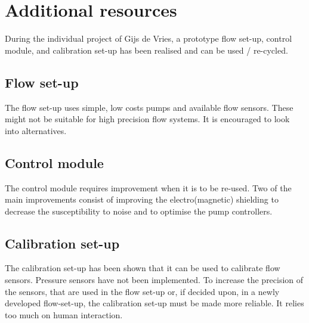 \section{Additional resources}
During the individual project of Gijs de Vries, a prototype flow set-up, control module, and calibration set-up has been realised and can be used / re-cycled.
\subsection{Flow set-up}
The flow set-up uses simple, low costs pumps and available flow sensors. These might not be suitable for high precision flow systems. It is encouraged to look into alternatives.
\subsection{Control module}
The control module requires improvement when it is to be re-used. Two of the main improvements consist of improving the electro(magnetic) shielding to decrease the susceptibility to noise and to optimise the pump controllers.
\subsection{Calibration set-up}
The calibration set-up has been shown that it can be used to calibrate flow sensors. Pressure sensors have not been implemented. To increase the precision of the sensors, that are used in the flow set-up or, if decided upon, in a newly developed flow-set-up, the calibration set-up must be made more reliable. It relies too much on human interaction.